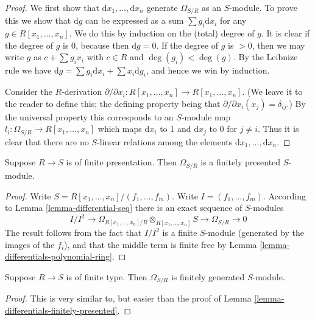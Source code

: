 \begin{proof}
We first show that $\text{d}x_1, \ldots, \text{d}x_n$
generate $\Omega_{S/R}$ as an $S$-module. To prove this
we show that $\text{d}g$ can be expressed as a
sum $\sum g_i \text{d}x_i$ for any $g \in R[x_1, \ldots, x_n]$.
We do this by induction on the (total) degree of $g$.
It is clear if the degree of $g$ is $0$, because then
$\text{d}g = 0$. If the degree of $g$ is $>0$, then
we may write $g$ as $c + \sum g_i x_i$ with $c\in R$
and $\deg(g_i) < \deg(g)$. By the Leibnize rule we have
$\text{d}g = \sum g_i \text{d} x_i + \sum x_i \text{d}g_i$,
and hence we win by induction.

\medskip\noindent
Consider the $R$-derivation $\partial / \partial x_i :
R[x_1, \ldots, x_n] \to R[x_1, \ldots, x_n]$. (We leave it to
the reader to define this; the defining property
being that $\partial / \partial x_i (x_j) = \delta_{ij}$.)
By the universal property this corresponds to an $S$-module map $l_i :
\Omega_{S/R} \to R[x_1, \ldots, x_n]$ which maps $\text{d}x_i$
to $1$ and $\text{d}x_j$ to $0$ for $j \not= i$.
Thus it is clear that there are no $S$-linear relations
among the elements $\text{d}x_1, \ldots, \text{d}x_n$.
\end{proof}

\begin{lemma}
\label{lemma-differentials-finitely-presented}
Suppose $R \to S$ is of finite presentation.
Then $\Omega_{S/R}$ is a finitely presented
$S$-module.
\end{lemma}

\begin{proof}
Write $S = R[x_1, \ldots, x_n]/(f_1, \ldots, f_m)$.
Write $I = (f_1, \ldots, f_m)$. According
to Lemma \ref{lemma-differential-seq} there is an exact sequence
of $S$-modules
$$
I/I^2
\to
\Omega_{R[x_1, \ldots, x_n]/R}\otimes_{R[x_1, \ldots, x_n]} S
\to
\Omega_{S/R}
\to
0
$$
The result follows from the fact that $I/I^2$ is a finite
$S$-module (generated by the images of the $f_i$), and that
the middle term is finite free by
Lemma \ref{lemma-differentials-polynomial-ring}.
\end{proof}

\begin{lemma}
\label{lemma-differentials-finitely-generated}
Suppose $R \to S$ is of finite type.
Then $\Omega_{S/R}$ is finitely generated
$S$-module.
\end{lemma}

\begin{proof}
This is very similar to, but easier than the proof
of Lemma \ref{lemma-differentials-finitely-presented}.
\end{proof}

